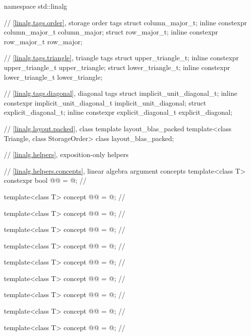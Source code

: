\begin{codeblock}
namespace std::linalg {
  // \ref{linalg.tags.order}, storage order tags
  struct column_major_t;
  inline constexpr column_major_t column_major;
  struct row_major_t;
  inline constexpr row_major_t row_major;

  // \ref{linalg.tags.triangle}, triangle tags
  struct upper_triangle_t;
  inline constexpr upper_triangle_t upper_triangle;
  struct lower_triangle_t;
  inline constexpr lower_triangle_t lower_triangle;

  // \ref{linalg.tags.diagonal}, diagonal tags
  struct implicit_unit_diagonal_t;
  inline constexpr implicit_unit_diagonal_t implicit_unit_diagonal;
  struct explicit_diagonal_t;
  inline constexpr explicit_diagonal_t explicit_diagonal;

  // \ref{linalg.layout.packed}, class template layout_blas_packed
  template<class Triangle, class StorageOrder>
    class layout_blas_packed;

  // \ref{linalg.helpers}, exposition-only helpers

  // \ref{linalg.helpers.concepts}, linear algebra argument concepts
  template<class T>
    constexpr bool @@ = @\seebelow@;               // \expos

  template<class T>
    concept @@ = @\seebelow@;                      // \expos

  template<class T>
    concept @@ = @\seebelow@;                     // \expos

  template<class T>
    concept @@ = @\seebelow@;                   // \expos

  template<class T>
    concept @@ = @\seebelow@;                      // \expos

  template<class T>
    concept @@ = @\seebelow@;                     // \expos

  template<class T>
    concept @@ = @\seebelow@;                   // \expos

  template<class T>
    concept @@ = @\seebelow@;   // \expos

  template<class T>
    concept @@ = @\seebelow@;                      // \expos

  template<class T>
    concept @@ = @\seebelow@;                     // \expos

}
\end{codeblock}
